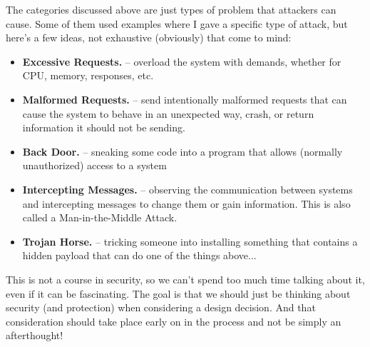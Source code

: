 The categories discussed above are just types of problem that attackers can cause. Some of them used examples where I gave a specific type of attack, but here's a few ideas, not exhaustive (obviously) that come to mind:

\begin{itemize}
	\item \textbf{Excessive Requests.} -- overload the system with demands, whether for CPU, memory, responses, etc.
	\item \textbf{Malformed Requests.} -- send intentionally malformed requests that can cause the system to behave in an unexpected way, crash, or return information it should not be sending.
	\item \textbf{Back Door.} -- sneaking some code into a program that allows (normally unauthorized) access to a system
	\item \textbf{Intercepting Messages.} -- observing the communication between systems and intercepting messages to change them or gain information. This is also called a Man-in-the-Middle Attack.
	\item \textbf{Trojan Horse.} -- tricking someone into installing something that contains a hidden payload that can do one of the things above...
\end{itemize}

This is not a course in security, so we can't spend too much time talking about it, even if it can be fascinating. The goal is that we should just be thinking about security (and protection) when considering a design decision. And that consideration should take place early on in the process and not be simply an afterthought!



